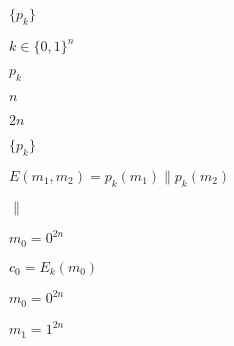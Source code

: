 \documentclass[10pt]{book}
\begin{document}
\begin{mdSnippets}
\newcommand{\zo}{\{0,1\}}
\newcommand{\E}{\mathbb{E}}
\newcommand{\getsr}{\leftarrow_R\;}

\begin{mdInlineSnippet}[794d2956e3379682bb8650ba84d7a1ef]%
$\{ p_k \}$\end{mdInlineSnippet}%
\begin{mdInlineSnippet}%
$k \in \zo^n$\end{mdInlineSnippet}%
\begin{mdInlineSnippet}%
$p_k$\end{mdInlineSnippet}%
\begin{mdInlineSnippet}[7b8b965ad4bca0e41ab51de7b31363a1]%
$n$\end{mdInlineSnippet}%
\begin{mdInlineSnippet}[21e2c0c0472b331622877accbe29b91b]%
$2n$\end{mdInlineSnippet}%
\begin{mdInlineSnippet}[794d2956e3379682bb8650ba84d7a1ef]%
$\{ p_k \}$\end{mdInlineSnippet}%
\begin{mdInlineSnippet}[5d7093c68a3d36469ed46494461794a1]%
$E(m_1,m_2)= p_k(m_1)\|p_k(m_2)$\end{mdInlineSnippet}%
\begin{mdInlineSnippet}[6b6916dc719f0070115683ee61bb7cf9]%
$\|$\end{mdInlineSnippet}%
\begin{mdInlineSnippet}%
$m_0 = 0^{2n}$\end{mdInlineSnippet}%
\begin{mdInlineSnippet}%
$c_0 = E_k(m_0)$\end{mdInlineSnippet}%
\begin{mdInlineSnippet}%
$m_0 = 0^{2n}$\end{mdInlineSnippet}%
\begin{mdInlineSnippet}[e373fc582c9727c71898a601632e28f6]%
$m_1 = 1^{2n}$\end{mdInlineSnippet}%

\end{mdSnippets}
\end{document}
